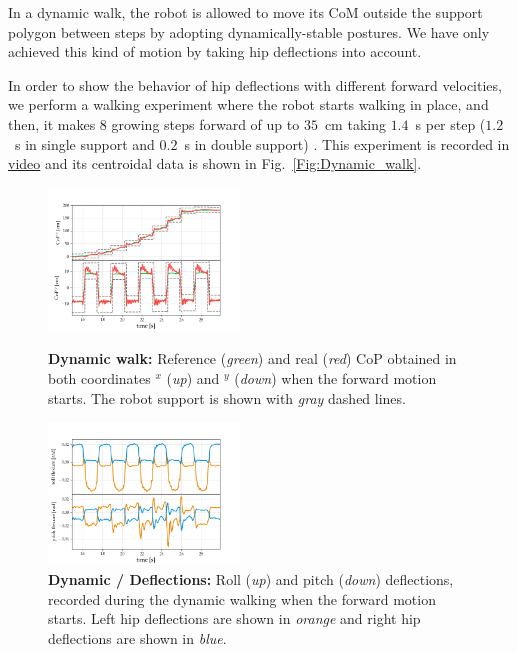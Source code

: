 \documentclass[letterpaper, 10 pt, conference]{ieeeconf}  %
\begin{document}
In a dynamic walk, the robot is allowed to move its CoM outside the support polygon between steps by adopting dynamically-stable postures.
%
We have only achieved this kind of motion by taking hip deflections into account. 

In order to show the behavior of hip deflections with different forward velocities, we perform a walking experiment where the robot starts walking in place, and then, it makes $8$ growing steps forward of up to $35$~cm taking $1.4$~s per step
%
($1.2$~s in single support and $0.2$~s in double support)%
%
. This experiment is recorded in \href{https://gepettoweb.laas.fr/articles/talos_centroidal_mpc_torque_control.html}{video} and its centroidal data is shown in Fig.~\ref{Fig:Dynamic_walk}. 

    
\begin{figure}[t!]
	\centering
	    \includegraphics[trim={0 1mm 0 3mm},clip,width=0.45\textwidth]{images/DynamicWalk.png}
    	\caption{\textbf{Dynamic walk:} Reference (\textit{green}) and real (\textit{red}) CoP obtained in both coordinates $^x$ (\textit{up}) and $^y$ (\textit{down}) when the forward motion starts. The robot support is shown with \textit{gray} dashed lines. }
	    \label{Fig:Dynamic_walk}
	\vfill    
	\centering
	    \includegraphics[trim={0 1mm 0 3mm},clip,width=0.45\textwidth]{images/DynamicFlexure.png}
    	\caption{\textbf{Dynamic / Deflections:} Roll (\textit{up}) and pitch (\textit{down}) deflections, recorded during the dynamic walking when the forward motion starts. Left hip deflections are shown in \textit{orange} and right hip deflections are shown in \textit{blue}.}
    	\label{Fig:Dynamic_Flexure}
\end{figure} 
\end{document}
